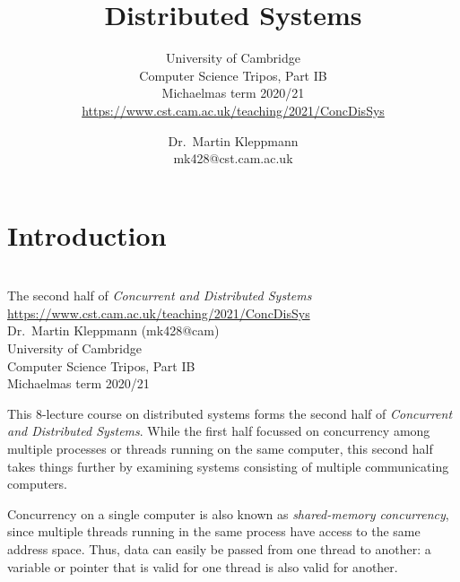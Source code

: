 \newcommand{\coursepath}{/teaching/2021/ConcDisSys}
\newcommand{\courseurl}{\url{https://www.cst.cam.ac.uk\coursepath}}
\newcommand{\thisyear}{2020/21}


\title{Distributed Systems}
\subtitle{University of Cambridge\\Computer Science Tripos, Part IB\\Michaelmas term \thisyear\\\courseurl}
        
\author{Dr.\ Martin Kleppmann\\mk428@cst.cam.ac.uk}
\date{}
\maketitle

\section{Introduction}

\begin{frame}
    \label{s:title}
    \begin{center}
        \textbf{\huge{\color{darkblue}{Distributed Systems}}} \\[2em]
        The second half of \emph{Concurrent and Distributed Systems}\\[0.5em]
        \courseurl\\[2em]
        Dr.\ Martin Kleppmann (mk428@cam) \\[0.5em]
        University of Cambridge \\[0.5em]
        Computer Science Tripos, Part IB \\[0.5em]
        Michaelmas term \thisyear \\[0.5em]
    \end{center}
\end{frame}

This 8-lecture course on distributed systems forms the second half of \emph{Concurrent and Distributed Systems}.
While the first half focussed on concurrency among multiple processes or threads running on the same computer, this second half takes things further by examining systems consisting of multiple communicating computers.

Concurrency on a single computer is also known as \emph{shared-memory concurrency}, since multiple threads running in the same process have access to the same address space.
Thus, data can easily be passed from one thread to another: a variable or pointer that is valid for one thread is also valid for another.

